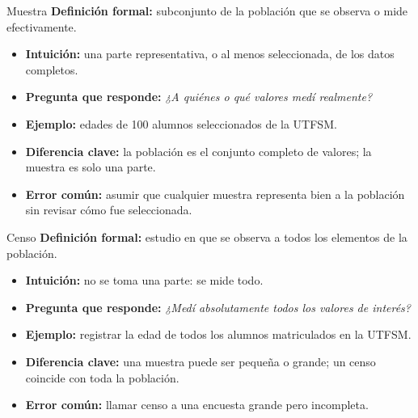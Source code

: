 \documentclass[aspectratio=169,11pt]{beamer}
\newcommand{\pregunta}[1]{\textbf{Pregunta que responde:} \emph{#1}}
\newcommand{\errorcomun}[1]{\textbf{Error común:} #1}
\newcommand{\diferencia}[1]{\textbf{Diferencia clave:} #1}
\begin{document}
\begin{frame}{Muestra}
\textbf{Definición formal:} subconjunto de la población que se observa o mide efectivamente.
\begin{itemize}
  \item \textbf{Intuición:} una parte representativa, o al menos seleccionada, de los datos completos.
  \item \pregunta{¿A quiénes o qué valores medí realmente?}
  \item \textbf{Ejemplo:} edades de 100 alumnos seleccionados de la UTFSM.
  \item \diferencia{la población es el conjunto completo de valores; la muestra es solo una parte.}
  \item \errorcomun{asumir que cualquier muestra representa bien a la población sin revisar cómo fue seleccionada.}
\end{itemize}
\end{frame}

\begin{frame}{Censo}
\textbf{Definición formal:} estudio en que se observa a todos los elementos de la población.
\begin{itemize}
  \item \textbf{Intuición:} no se toma una parte: se mide todo.
  \item \pregunta{¿Medí absolutamente todos los valores de interés?}
  \item \textbf{Ejemplo:} registrar la edad de todos los alumnos matriculados en la UTFSM.
  \item \diferencia{una muestra puede ser pequeña o grande; un censo coincide con toda la población.}
  \item \errorcomun{llamar censo a una encuesta grande pero incompleta.}
\end{itemize}
\end{frame}
\end{document}

